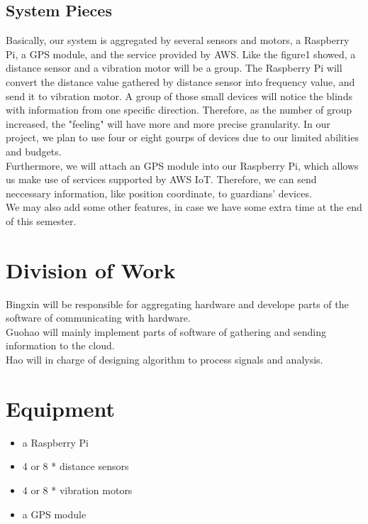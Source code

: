 \documentclass{article}
\begin{document}
        \subsection{System Pieces}
        Basically, our system is aggregated by several sensors and motors, a Raspberry Pi, a GPS module, and the service provided by AWS. Like the figure1 showed, a distance sensor and a vibration motor will be a group. The Raspberry Pi will convert the distance value gathered by distance sensor into frequency value, and send it to vibration motor. A group of those small devices will notice the blinds with information from one specific direction. Therefore, as the number of group increased, the "feeling" will have more and more precise granularity. In our project, we plan to use four or eight gourps of devices due to our limited abilities and budgets.\\
        Furthermore, we will attach an GPS module into our Raspberry Pi, which allows us make use of services supported by AWS IoT. Therefore, we can send neccessary information, like position coordinate, to guardians' devices.\\
        We may also add some other features, in case we have some extra time at the end of this semester.
        
    \section{Division of Work}
        Bingxin will be responsible for aggregating hardware and develope parts of the software of communicating with hardware.\\
        Guohao will mainly implement parts of software of gathering and sending information to the cloud.\\
        Hao will in charge of designing algorithm to process signals and analysis.
    \section{Equipment}
        \begin{itemize}
            \item a Raspberry Pi
            \item 4 or 8 * distance sensors
            \item 4 or 8 * vibration motors
            \item a GPS module
        \end{itemize}
\end{document}
